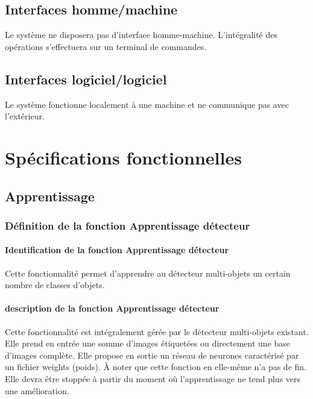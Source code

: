 \documentclass[debug,nodate,hideweeklyreports]{polytech/polytech}
\begin{document}
\section{Interfaces homme/machine}

Le système ne disposera pas d’interface homme-machine. L’intégralité des opérations s’effectuera sur un terminal de commandes.

\section{Interfaces logiciel/logiciel}

Le système fonctionne localement à une machine et ne communique pas avec l'extérieur.

\chapter{Spécifications fonctionnelles}
\label{ann:chap2}

\section{Apprentissage}

\subsection{Définition de la fonction Apprentissage détecteur}

\subsubsection{Identification de la fonction Apprentissage détecteur}

Cette fonctionnalité permet d’apprendre au détecteur multi-objets un certain nombre de classes d’objets.

\subsubsection{description de la fonction Apprentissage détecteur}

Cette fonctionnalité est intégralement gérée par le détecteur multi-objets existant. 
Elle prend en entrée une somme d’images étiquetées ou directement une base d’images complète. Elle propose en sortie un réseau de neurones caractérisé par un fichier weights (poids).
À noter que cette fonction en elle-même n’a pas de fin. Elle devra être stoppée à partir du moment où l’apprentissage ne tend plus vers une amélioration.
\end{document}
